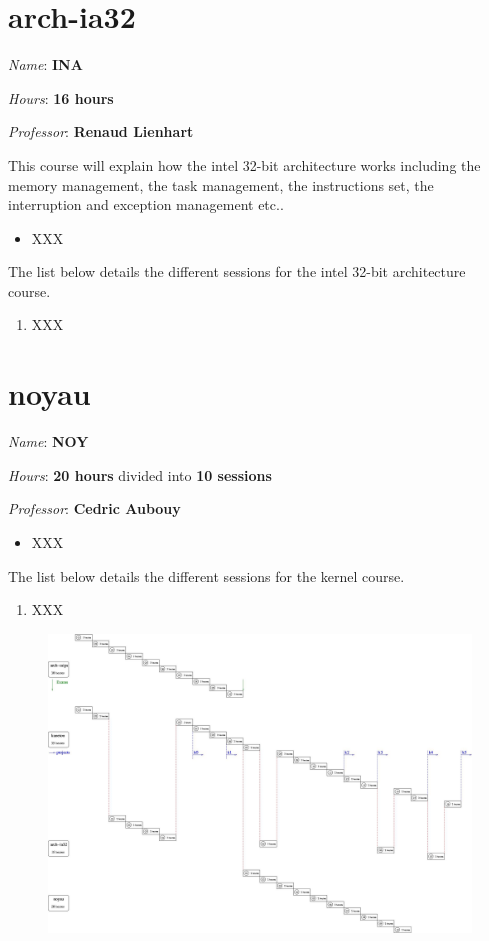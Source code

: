 \begin{multicols}{2}
%
%

\section{arch-ia32}

\textit{Name}: \textbf{INA}

\textit{Hours}: \textbf{16 hours}

\textit{Professor}: \textbf{Renaud Lienhart}

This course will explain how the intel 32-bit architecture works including
the memory management, the task management, the instructions set, the
interruption and exception management etc..

\begin{itemize}
  \item
    XXX
\end{itemize}

The list below details the different sessions for the intel 32-bit
architecture course.

\begin{enumerate}
  \item
    XXX
\end{enumerate}



%
%

\section{noyau}

\textit{Name}: \textbf{NOY}

\textit{Hours}: \textbf{20 hours} divided into \textbf{10 sessions}

\textit{Professor}: \textbf{Cedric Aubouy}

\begin{itemize}
  \item
    XXX
\end{itemize}

The list below details the different sessions for the kernel course.

\begin{enumerate}
  \item
    XXX
\end{enumerate}



\end{multicols}

\begin{figure}[h]
\centerline{\includegraphics[angle=-90,scale=0.3]{figures/schedule.jpg}}
\end{figure}


